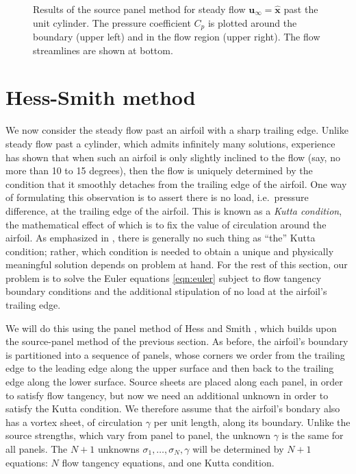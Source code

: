 \documentclass[10pt]{article}
\newcommand\defn[1]{\emph{#1}}
\def\ie{i.e.~}
\begin{document}
\begin{figure}[H]
\begin{center}
\caption{Results of the source panel method for steady flow $\mathbf u_\infty=\hat{\mathbf x}$ past the unit cylinder.  The pressure coefficient $C_p$ is plotted around the boundary (upper left) and in the flow region (upper right).  The flow streamlines are shown at bottom.}\label{fig:cylinder_ubem2d}
\end{center}
\end{figure}

\section{Hess-Smith method}
We now consider the steady flow past an airfoil with a sharp trailing edge.  Unlike steady flow past a cylinder, which admits infinitely many solutions, experience has shown that when such an airfoil is only slightly inclined to the flow (say, no more than 10 to 15 degrees), then the flow is uniquely determined by the condition that it smoothly detaches from the trailing edge of the airfoil.  One way of formulating this observation is to assert there is no load, \ie pressure difference, at the trailing edge of the airfoil.  This is known as a \defn{Kutta condition}, the mathematical effect of which is to fix the value of circulation around the airfoil.  As emphasized in \cite{basu-hancock}, there is generally no such thing as ``the'' Kutta condition; rather, which condition is needed to obtain a unique and physically meaningful solution depends on problem at hand.  For the rest of this section, our problem is to solve the Euler equations \eqref{eqn:euler} subject to flow tangency boundary conditions and the additional stipulation of no load at the airfoil's trailing edge.  

We will do this using the panel method of Hess and Smith \cite{hess-smith}, which builds upon the source-panel method of the previous section.  As before, the airfoil's boundary is partitioned into a sequence of panels, whose corners we order from the trailing edge to the leading edge along the upper surface and then back to the trailing edge along the lower surface.  Source sheets are placed along each panel, in order to satisfy flow tangency, but now we need an additional unknown in order to satisfy the Kutta condition.  We therefore assume that the airfoil's bondary also has a vortex sheet, of circulation $\gamma$ per unit length, along its boundary.  Unlike the source strengths, which vary from panel to panel, the unknown $\gamma$ is the same for all panels.  The $N+1$ unknowns $\sigma_1,\ldots,\sigma_N,\gamma$ will be determined by $N+1$ equations: $N$ flow tangency equations, and one Kutta condition.
\end{document}
